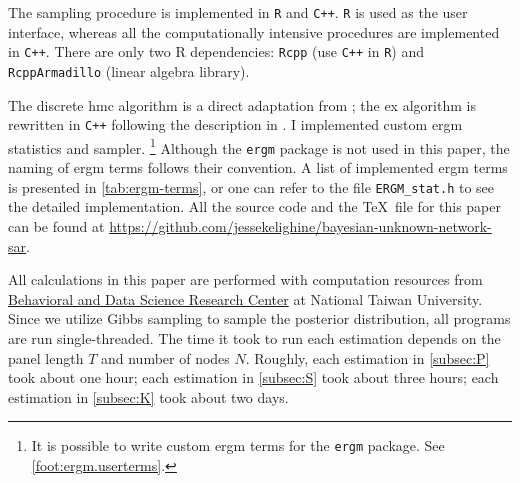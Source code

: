 \documentclass[a4paper]{article}
\begin{document}


The sampling procedure is implemented in \Verb"R" and \Verb"C++".
\Verb"R" is used as the user interface,
whereas all the computationally intensive procedures are implemented in \Verb"C++".
There are only two R dependencies:
\Verb"Rcpp" (use \Verb"C++" in \Verb"R") and \Verb"RcppArmadillo" (linear algebra library).

The discrete \gls{hmc} algorithm is a direct adaptation from \cite{pakman-paninski-2015};
the \gls{ex} algorithm is rewritten in \Verb"C++" following the description in \cite{caimo-friel-2011}.
I implemented custom \gls{ergm} statistics and sampler.
\footnote{
	It is possible to write custom \gls{ergm} terms for the \Verb"ergm" package.
	See \autoref{foot:ergm.userterms}.
}
Although the \Verb"ergm" package is not used in this paper,
the naming of \gls{ergm} terms follows their convention.
A list of implemented \gls{ergm} terms is presented in \autoref{tab:ergm-terms},
or one can refer to the file \Verb"ERGM_stat.h" to see the detailed implementation.
All the source code and the \TeX\ file for this paper can be found at
\url{https://github.com/jessekelighine/bayesian-unknown-network-sar}.

All calculations in this paper are performed with
computation resources from \href{https://bdsrc.ntu.edu.tw/en}{Behavioral and Data Science Research Center} at National Taiwan University.
Since we utilize Gibbs sampling to sample the posterior distribution,
all programs are run single-threaded.
The time it took to run each estimation depends on the panel length $T$ and number of nodes $N$.
Roughly, each estimation in \autoref{subsec:P} took about one hour;
each estimation in \autoref{subsec:S} took about three hours;
each estimation in \autoref{subsec:K} took about two days.
\end{document}
